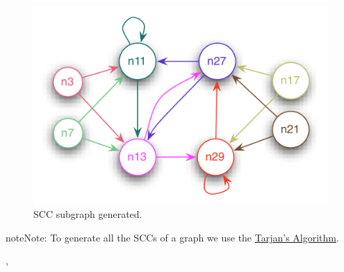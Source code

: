 \documentclass[letterpaper,10pt,english]{sphinxmanual}
\begin{document}
\begin{fulllineitems}
\begin{figure}[htbp]
\includegraphics{example_scc.png}
\caption{SCC subgraph generated.}\end{figure}

\begin{notice}{note}{Note:}
To generate all the SCCs of a graph we use the \href{https://github.com/bwesterb/py-tarjan/}{Tarjan's Algorithm}.
\end{notice}




{\hyperref[modelCheckingGraph:modelCheckingGraph.getModelCheckingAtoms]{}}, {\hyperref[modelCheckingGraph:modelCheckingGraph.getModelCheckingGraph]{}} 



\end{fulllineitems}

\end{document}
